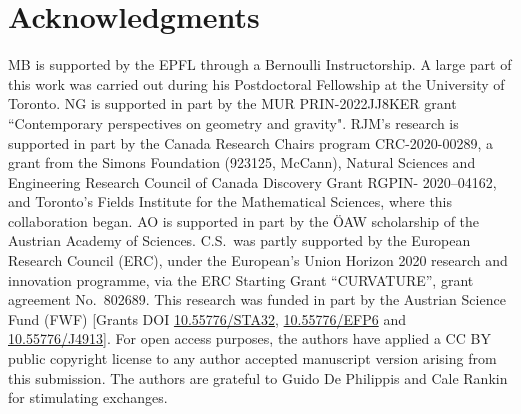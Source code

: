 \documentclass[12pt]{amsart}
\begin{document}
\section*{Acknowledgments}

MB is supported by the EPFL through a Bernoulli Instructorship. A large part of this work was carried out during his Postdoctoral Fellowship at the University of Toronto.  NG is supported in part by the MUR PRIN-2022JJ8KER grant ``Contemporary perspectives on geometry and gravity". RJM's research is supported in part by the Canada Research Chairs program CRC-2020-00289, a grant from the Simons Foundation (923125, McCann), Natural Sciences and Engineering Research Council of Canada Discovery Grant RGPIN- 2020--04162, and Toronto's Fields Institute for the Mathematical Sciences, where this collaboration began. AO is supported in part by the ÖAW scholarship of the Austrian Academy of Sciences. C.S.\ was partly supported by the European Research Council (ERC), under the European’s Union Horizon 2020 research and innovation programme, via the ERC Starting Grant “CURVATURE”, grant agreement No.\ 802689. This research was funded in part by the Austrian Science Fund (FWF) [Grants DOI \href{https://doi.org/10.55776/STA32}{10.55776/STA32}, \href{https://doi.org/10.55776/EFP6}{10.55776/EFP6} and \href{https://doi.org/10.55776/J4913}{10.55776/J4913}]. For open access purposes, the authors have applied a CC BY public copyright license to any author accepted manuscript version arising from this submission. The authors are grateful to Guido De Philippis and Cale Rankin for stimulating exchanges.



 

\end{document}
